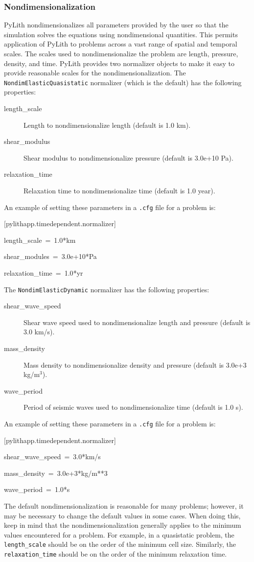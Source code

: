 \subsubsection{Nondimensionalization}

PyLith nondimensionalizes all parameters provided by the user so that
the simulation solves the equations using nondimensional quantities.
This permits application of PyLith to problems across a vast range
of spatial and temporal scales. The scales used to nondimensionalize
the problem are length, pressure, density, and time. PyLith provides
two normalizer objects to make it easy to provide reasonable scales
for the nondimensionalization. The \texttt{NondimElasticQuasistatic}
normalizer (which is the default) has the following properties:
\begin{description}
\item [{length\_scale}] Length to nondimensionalize length (default is
1.0 km).
\item [{shear\_modulus}] Shear modulus to nondimensionalize pressure (default
is 3.0e+10 Pa).
\item [{relaxation\_time}] Relaxation time to nondimensionalize time (default
is 1.0 year).
\end{description}
An example of setting these parameters in a \texttt{.cfg} file for
a problem is:
\begin{lyxcode}
{[}pylithapp.timedependent.normalizer{]}

length\_scale~=~1.0{*}km

shear\_modules~=~3.0e+10{*}Pa

relaxation\_time~=~1.0{*}yr
\end{lyxcode}
The \texttt{NondimElasticDynamic} normalizer has the following properties:
\begin{description}
\item [{shear\_wave\_speed}] Shear wave speed used to nondimensionalize
length and pressure (default is 3.0 km/s).
\item [{mass\_density}] Mass density to nondimensionalize density and pressure
(default is 3.0e+3 kg/m$^{3}$).
\item [{wave\_period}] Period of seismic waves used to nondimensionalize
time (default is 1.0 s).
\end{description}
An example of setting these parameters in a \texttt{.cfg} file for
a problem is:
\begin{lyxcode}
{[}pylithapp.timedependent.normalizer{]}

shear\_wave\_speed~=~3.0{*}km/s

mass\_density~=~3.0e+3{*}kg/m{*}{*}3

wave\_period~=~1.0{*}s
\end{lyxcode}
The default nondimensionalization is reasonable for many problems;
however, it may be necessary to change the default values in some
cases. When doing this, keep in mind that the nondimensionalization
generally applies to the minimum values encountered for a problem.
For example, in a quasistatic problem, the \texttt{length\_scale}
should be on the order of the minimum cell size. Similarly, the \texttt{relaxation\_time}
should be on the order of the minimum relaxation time.


